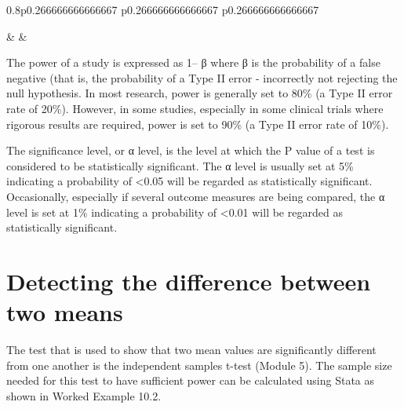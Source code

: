 \documentclass[
]{memoir}
\begin{document}
\begin{table}[ht]
\begin{centerbox}
\begin{threeparttable}
\begin{tabularx}{0.8\textwidth}{p{} p{} p{}}
\hhline{}

 &
 &
 \tabularnewline[-0.5pt]


\end{tabularx}
\end{threeparttable}\par\end{centerbox}

\end{table}
 

The power of a study is expressed as 1-- β where β is the probability of a false negative (that is, the probability of a Type II error - incorrectly not rejecting the null hypothesis. In most research, power is generally set to 80\% (a Type II error rate of 20\%). However, in some studies, especially in some clinical trials where rigorous results are required, power is set to 90\% (a Type II error rate of 10\%).

The significance level, or α level, is the level at which the P value of a test is considered to be statistically significant. The α level is usually set at 5\% indicating a probability of \textless0.05 will be regarded as statistically significant. Occasionally, especially if several outcome measures are being compared, the α level is set at 1\% indicating a probability of \textless0.01 will be regarded as statistically significant.

\hypertarget{detecting-the-difference-between-two-means}{%
\section{Detecting the difference between two means}\label{detecting-the-difference-between-two-means}}

The test that is used to show that two mean values are significantly different from one another is the independent samples t-test (Module 5). The sample size needed for this test to have sufficient power can be calculated using Stata as shown in Worked Example 10.2.
\end{document}
